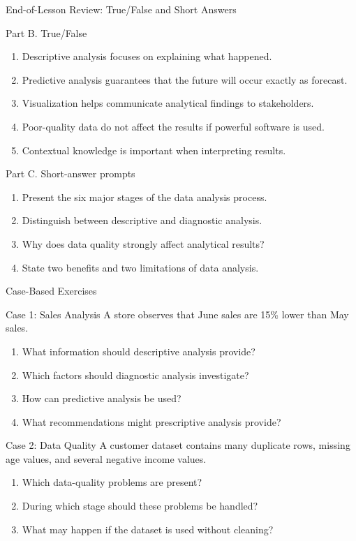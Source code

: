 \documentclass[aspectratio=169,11pt]{beamer}
\begin{document}
\begin{frame}{End-of-Lesson Review: True/False and Short Answers}
\begin{block}{Part B. True/False}
\begin{enumerate}
  \item Descriptive analysis focuses on explaining what happened.
  \item Predictive analysis guarantees that the future will occur exactly as forecast.
  \item Visualization helps communicate analytical findings to stakeholders.
  \item Poor-quality data do not affect the results if powerful software is used.
  \item Contextual knowledge is important when interpreting results.
\end{enumerate}
\end{block}
\begin{block}{Part C. Short-answer prompts}
\begin{enumerate}
  \item Present the six major stages of the data analysis process.
  \item Distinguish between descriptive and diagnostic analysis.
  \item Why does data quality strongly affect analytical results?
  \item State two benefits and two limitations of data analysis.
\end{enumerate}
\end{block}
\end{frame}

\begin{frame}{Case-Based Exercises}
\begin{block}{Case 1: Sales Analysis}
A store observes that June sales are 15\% lower than May sales.
\begin{enumerate}
  \item What information should descriptive analysis provide?
  \item Which factors should diagnostic analysis investigate?
  \item How can predictive analysis be used?
  \item What recommendations might prescriptive analysis provide?
\end{enumerate}
\end{block}
\begin{block}{Case 2: Data Quality}
A customer dataset contains many duplicate rows, missing age values, and several negative income values.
\begin{enumerate}
  \item Which data-quality problems are present?
  \item During which stage should these problems be handled?
  \item What may happen if the dataset is used without cleaning?
\end{enumerate}
\end{block}
\end{frame}
\end{document}

